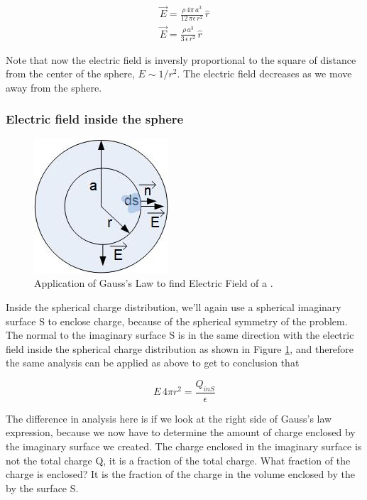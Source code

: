 \documentclass{ximera}
\begin{document}
\begin{eqnarray}
 \vec{E}  = \frac{\rho \, 4 \pi \, a^3}{12 \, \pi  \epsilon \, r^2} \, \hat{r} \\
 \vec{E}  = \frac{\rho \,   a^3}{3  \, \epsilon \, r^2} \, \hat{r}
\end{eqnarray}


Note that now the electric field is inversly proportional to the square of  distance from the center of the sphere, $E \sim 1/r^2$. The electric field decreases as we move away from the sphere.

\subsubsection{Electric field inside the sphere}




\begin{figure}[htbp]
\begin{center}
\includegraphics[scale=1]{../jpg/gaussSphereIn.jpg}
\end{center}
\caption{Application of Gauss's Law to find Electric Field of a .}
\label{fig:gaussSphereIn}
\end{figure}

Inside the spherical charge distribution, we'll again use a spherical imaginary surface  S to enclose charge, because of the spherical symmetry of the problem. The normal to the imaginary surface S is in the same direction with the electric field inside the spherical charge distribution as shown in Figure \ref{fig:gaussSphereIn}, and therefore the same analysis can be applied as above to get to conclusion that 



\begin{equation}
 E \, 4 \pi r^2 = \frac{Q_{inS}}{\epsilon}
\end{equation}




The difference in analysis here is if we look at the right side of Gauss's law  expression, because we now have to determine the amount of charge enclosed by the imaginary surface we created. The charge enclosed in the imaginary surface is not the total charge Q, it is a fraction of the total charge. What fraction of the charge is enclosed? It is the fraction of the charge in the volume enclosed by the by the surface S. 
\end{document}
